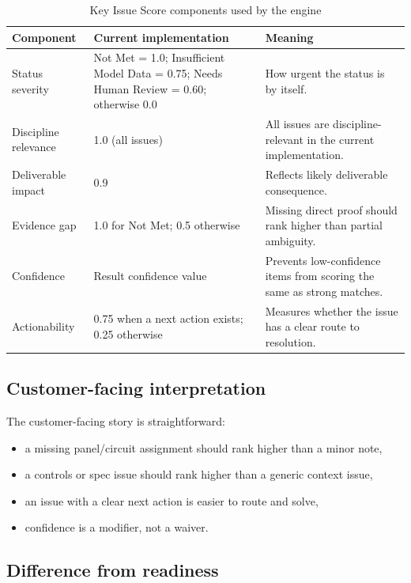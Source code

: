 \documentclass[10pt,letterpaper]{article}
\begin{document}
\begin{table}[!h]
\centering
\small
\caption{Key Issue Score components used by the engine}\label{tab:key-issue-components}
\begin{tabularx}{\linewidth}{p{1.4in}p{1.85in}>{\raggedright\arraybackslash}X}
\toprule
\textbf{Component} & \textbf{Current implementation} & \textbf{Meaning} \\
\midrule
Status severity & Not Met = 1.0; Insufficient Model Data = 0.75; Needs Human Review = 0.60; otherwise 0.0 & How urgent the status is by itself. \\
Discipline relevance & 1.0 (all issues) & All issues are discipline-relevant in the current implementation. \\
Deliverable impact & 0.9 & Reflects likely deliverable consequence. \\
Evidence gap & 1.0 for Not Met; 0.5 otherwise & Missing direct proof should rank higher than partial ambiguity. \\
Confidence & Result confidence value & Prevents low-confidence items from scoring the same as strong matches. \\
Actionability & 0.75 when a next action exists; 0.25 otherwise & Measures whether the issue has a clear route to resolution. \\
\bottomrule
\end{tabularx}
\end{table}

\subsection{Customer-facing interpretation}

The customer-facing story is straightforward:

\begin{itemize}
  \item a missing panel/circuit assignment should rank higher than a minor note,
  \item a controls or spec issue should rank higher than a generic context issue,
  \item an issue with a clear next action is easier to route and solve,
  \item confidence is a modifier, not a waiver.
\end{itemize}

\subsection{Difference from readiness}
\end{document}
